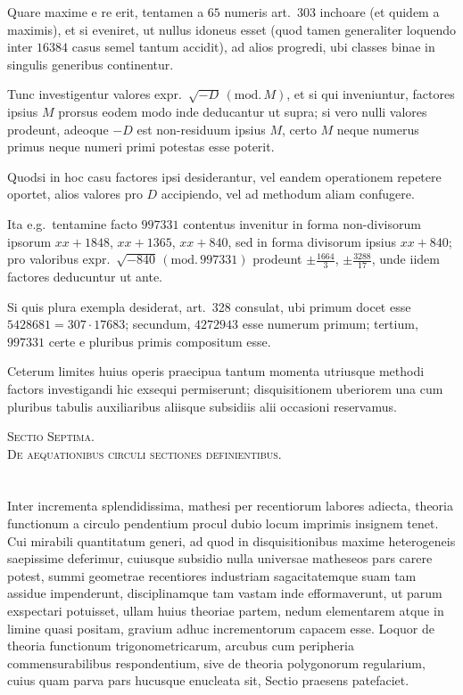 \documentclass[12pt,a4paper]{article}
\theoremstyle{plain}
\theoremstyle{definition}
\theoremstyle{remark}
\begin{document}
Quare maxime e re erit, tentamen a $65$ numeris art.\ 303 inchoare (et quidem a maximis), et si eveniret, ut nullus idoneus esset (quod tamen generaliter loquendo inter $16384$ casus semel tantum accidit), ad alios progredi, ubi classes binae in singulis generibus continentur.

Tunc investigentur valores expr.~$\surd{-D}\,(\mathrm{mod.}\,M)$, et si qui inveniuntur, factores ipsius $M$ prorsus eodem modo inde deducantur ut supra; si vero nulli valores prodeunt, adeoque $-D$ est non-residuum ipsius $M$, certo $M$ neque numerus primus neque numeri primi potestas esse poterit.

Quodsi in hoc casu factores ipsi desiderantur, vel eandem operationem repetere oportet, alios valores pro $D$ accipiendo, vel ad methodum aliam confugere.

Ita e.g.\ tentamine facto $997331$ contentus invenitur in forma non-divisorum ipsorum $xx+1848$, $xx+1365$, $xx+840$, sed in forma divisorum ipsius $xx+840$; pro valoribus expr.~$\surd{-840}\,(\mathrm{mod.}\,997331)$ prodeunt $\pm\frac{1664}{3}$, $\pm\frac{3288}{17}$, unde iidem factores deducuntur ut ante.

Si quis plura exempla desiderat, art.\ 328 consulat, ubi primum docet esse $5428681=307\cdot 17683$; secundum, $4272943$ esse numerum primum; tertium, $997331$ certe e pluribus primis compositum esse.

Ceterum limites huius operis praecipua tantum momenta utriusque methodi factors investigandi hic exsequi permiserunt; disquisitionem uberiorem una cum pluribus tabulis auxiliaribus aliisque subsidiis alii occasioni reservamus.

\bigskip
\noindent\textsc{Sectio Septima.}\\
\noindent\textsc{De aequationibus circuli sectiones definientibus.}

\section{}

Inter incrementa splendidissima, mathesi per recentiorum labores adiecta, theoria functionum a circulo pendentium procul dubio locum imprimis insignem tenet. Cui mirabili quantitatum generi, ad quod in disquisitionibus maxime heterogeneis saepissime deferimur, cuiusque subsidio nulla universae matheseos pars carere potest, summi geometrae recentiores industriam sagacitatemque suam tam assidue impenderunt, disciplinamque tam vastam inde efformaverunt, ut parum exspectari potuisset, ullam huius theoriae partem, nedum elementarem atque in limine quasi positam, gravium adhuc incrementorum capacem esse. Loquor de theoria functionum trigonometricarum, arcubus cum peripheria commensurabilibus respondentium, sive de theoria polygonorum regularium, cuius quam parva pars hucusque enucleata sit, Sectio praesens patefaciet.
\end{document}
